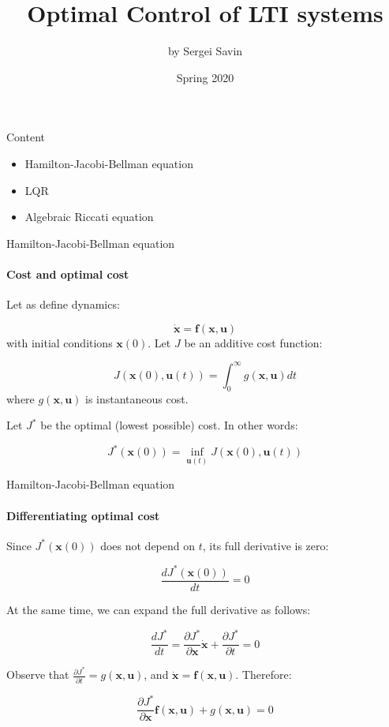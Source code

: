 \documentclass{beamer}
\title{Optimal Control of LTI systems}
\author{by Sergei Savin}
\date{Spring 2020}
\begin{document}
\maketitle


\begin{frame}{Content}
\begin{itemize}
\item Hamilton-Jacobi-Bellman equation
\item LQR
\item Algebraic Riccati equation
\end{itemize}
\end{frame}

\begin{frame}{Hamilton-Jacobi-Bellman equation}
\framesubtitle{Cost and optimal cost}
\begin{flushleft}

Let as define dynamics:

\[
\dot {\mathbf x} = \mathbf f (\mathbf x, \mathbf u)
\]
%
with initial conditions $\mathbf x(0)$. Let $J$ be an additive cost function:

\[
J (\mathbf x(0), \mathbf u(t)) = \int_0^\infty g(\mathbf x, \mathbf u) dt
\]
%
where $g(\mathbf  x, \mathbf  u)$ is instantaneous cost.

\bigskip
\bigskip

Let $J^*$ be the optimal (lowest possible) cost. In other words:

\[
J^*(\mathbf x(0)) = \underset{\mathbf u(t)}{\inf{}} J(\mathbf x(0), \mathbf u(t))
\]


\end{flushleft}
\end{frame}

\begin{frame}{Hamilton-Jacobi-Bellman equation}
\framesubtitle{Differentiating optimal cost}
\begin{flushleft}
Since $J^*(\mathbf x(0))$ does not depend on $t$, its full derivative is zero:

\[
\frac{d J^*(\mathbf x(0))}{dt} = 0
\]

At the same time, we can expand the full derivative as follows:

\[
\frac{d J^*}{dt } = 
\frac{\partial J^*}{\partial \mathbf x} \dot {\mathbf x} +
\frac{\partial J^*}{\partial t} = 0
\]

Observe that $\frac{\partial J^*}{\partial t} = g(\mathbf x, \mathbf u)$, and $\dot {\mathbf x} = \mathbf f (\mathbf x, \mathbf u)$. Therefore:

\[
\frac{\partial J^*}{\partial \mathbf x} \mathbf f (\mathbf x, \mathbf u) +
g(\mathbf x, \mathbf u) = 0
\]

\end{flushleft}
\end{frame}
\end{document}
